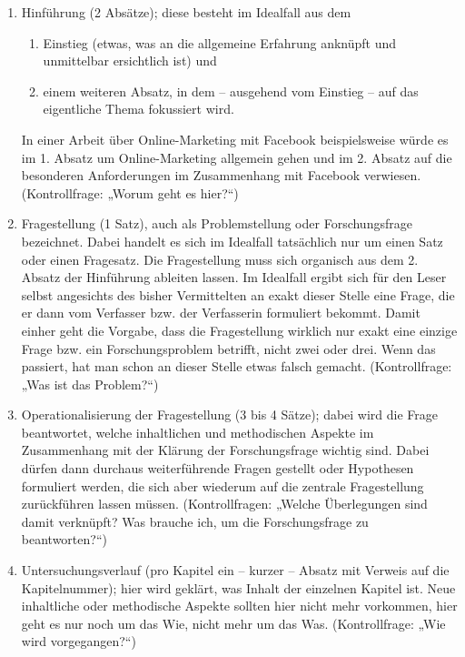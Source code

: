 \begin{enumerate}
	\item Hinführung (2 Absätze); diese besteht im Idealfall aus dem
		\begin{enumerate}
			\item Einstieg (etwas, was an die allgemeine Erfahrung anknüpft und unmittelbar ersichtlich ist) und
			\item einem weiteren Absatz, in dem – ausgehend vom Einstieg – auf das eigentliche Thema fokussiert wird.
		\end{enumerate}
		In einer Arbeit über Online-Marketing mit Facebook beispielsweise würde es im 1. Absatz um Online-Marketing allgemein gehen und im 2. Absatz
		auf die besonderen Anforderungen im Zusammenhang mit Facebook verwiesen. (Kontrollfrage: „Worum geht es hier?“)

	\item Fragestellung (1 Satz), auch als Problemstellung oder Forschungsfrage bezeichnet. Dabei handelt es sich im
		Idealfall tatsächlich nur um einen Satz oder einen Fragesatz. Die Fragestellung muss sich organisch aus dem 2. Absatz der Hinführung
		ableiten lassen. Im Idealfall ergibt sich für den Leser selbst angesichts des bisher Vermittelten an exakt dieser Stelle eine Frage, die er
		dann vom Verfasser bzw. der Verfasserin
		formuliert bekommt. Damit einher geht die Vorgabe, dass die Fragestellung wirklich nur exakt eine einzige Frage bzw. ein Forschungsproblem
		betrifft, nicht zwei oder drei. Wenn das passiert, hat man schon an dieser Stelle etwas falsch gemacht.  (Kontrollfrage: „Was ist das
		Problem?“)
	\item Operationalisierung der Fragestellung (3 bis 4 Sätze); dabei wird die Frage beantwortet, welche inhaltlichen und methodischen Aspekte im
		Zusammenhang mit der Klärung der Forschungsfrage wichtig sind. Dabei dürfen dann durchaus weiterführende Fragen gestellt oder Hypothesen
		formuliert werden, die sich aber wiederum
		auf die zentrale Fragestellung zurückführen lassen müssen. (Kontrollfragen: „Welche Überlegungen sind damit verknüpft? Was brauche ich, um
		die Forschungsfrage zu beantworten?“)
	\item Untersuchungsverlauf (pro Kapitel ein – kurzer – Absatz mit Verweis auf die Kapitelnummer); hier wird geklärt, was Inhalt der einzelnen
		Kapitel ist. Neue inhaltliche oder methodische Aspekte sollten hier nicht mehr vorkommen, hier geht es nur noch um das Wie, nicht mehr um
		das Was. (Kontrollfrage: „Wie wird
		vorgegangen?“)
\end{enumerate}

